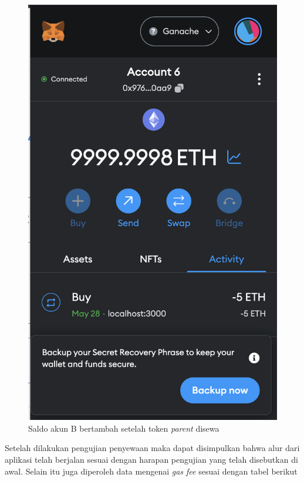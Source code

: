 \begin{itemize}
\begin{figure} [H]
          \includegraphics[scale=0.4]{gambar/img-test-share-rent-7.png}
          \caption{Saldo akun B bertambah setelah token \emph{parent} disewa}
          \label{fig:TestShareResultRental6}
        \end{figure}
    \end{itemize}

  Setelah dilakukan pengujian penyewaan maka dapat disimpulkan bahwa alur dari aplikasi telah berjalan sesuai dengan harapan pengujian yang telah disebutkan di awal. Selain itu juga diperoleh data mengenai \emph{gas fee} sesuai dengan tabel berikut
  
